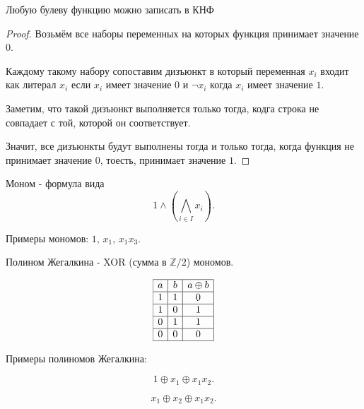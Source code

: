 \begin{theorem} \thmslashn

    Любую булеву функцию можно записать в КНФ

    \begin{proof} \thmslashn
    
        Возьмём все наборы переменных на которых функция принимает значение $0$.

        Каждому такому набору сопоставим дизъюнкт в который переменная $x_{i}$ входит как литерал $x_{i}$ если $x_{i}$ имеет значение $0$ и $\neg x_{i}$ когда $x_{i}$ имеет значение $1$.

        Заметим, что такой дизъюнкт выполняется только тогда, кодга строка не совпадает с той, которой он соответствует.

        Значит, все дизъюнкты будут выполнены тогда и только тогда, когда функция не принимает значение $0$, тоесть, принимает значение $1$.
    \end{proof}
\end{theorem}

\begin{definition} \thmslashn 

    Моном - формула вида
    \[ 1 \land \left( \bigwedge_{i\in I} x_{i}\right)  .\]
\end{definition}

\begin{example} \thmslashn

    Примеры мономов: $1$, $x_1$, $x_1x_3$.
\end{example}

\begin{definition} \thmslashn 

    Полином Жегалкина - XOR (сумма в $\mathbb{Z}/2$) мономов.

    \begin{equation*}
        \begin{array}{|c|c|c|} \hline
            a & b & a \oplus b\\ \hline
            1 & 1 & 0\\ \hline
            1 & 0 & 1 \\ \hline
            0 & 1 & 1 \\ \hline
            0 & 0 & 0 \\ \hline
        \end{array}
    \end{equation*}
\end{definition}
\begin{example} \thmslashn

    Примеры полиномов Жегалкина:

    \[ 1 \oplus x_1 \oplus x_1x_2 .\] 

    \[ x_1 \oplus x_2 \oplus x_1x_2 .\] 
\end{example}

